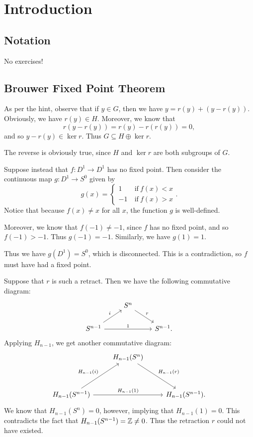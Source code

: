 \documentclass[../../solutions.tex]{subfiles}
\begin{document}
\section{Introduction} 
\subsection{Notation} 
No exercises! 

\subsection{Brouwer Fixed Point Theorem} 
\begin{exercise} \leavevmode
As per the hint, observe that if $y\in G$, then we have $y=r(y)+(y-r(y))$. Obviously, we have $r(y)\in H$. Moreover, we know that \[r(y-r(y))=r(y)-r(r(y))=0,\] and so $y-r(y)\in\ker r$. Thus $G\subseteq H\oplus\ker r$. 

The reverse is obviously true, since $H$ and $\ker r$ are both subgroups of $G$. 
\end{exercise} 

\begin{exercise} \leavevmode
Suppose instead that $f:D^1\to D^1$ has no fixed point. Then consider the continuous map $g:D^1\to S^0$ given by \[g(x)=\begin{cases}1&~\text{if}~f(x)<x\\-1&~\text{if}~f(x)>x\end{cases}.\] Notice that because $f(x)\ne x$ for all $x$, the function $g$ is well-defined. 

Moreover, we know that $f(-1)\ne-1$, since $f$ has no fixed point, and so $f(-1)>-1$. Thus $g(-1)=-1$. Similarly, we have $g(1)=1$. 

Thus we have $g(D^1)=S^0$, which is disconnected. This is a contradiction, so $f$ must have had a fixed point. 
\end{exercise} 

\begin{exercise} \leavevmode
Suppose that $r$ is such a retract. Then we have the following commutative diagram: 
\[\begin{tikzcd}
&S^n\arrow[rd,"r"]&\\
S^{n-1}\arrow[ru,"i"]\arrow[rr,"1"]&&S^{n-1}. 
\end{tikzcd}\] 
Applying $H_{n-1}$, we get another commutative diagram: 
\[\begin{tikzcd}[row sep=huge] 
&H_{n-1}(S^n)\arrow[rd,"H_{n-1}(r)"]&\\
H_{n-1}(S^{n-1})\arrow[ru,"H_{n-1}(i)"]\arrow[rr,"H_{n-1}(1)"]&&H_{n-1}(S^{n-1}).
\end{tikzcd}\]
We know that $H_{n-1}(S^n)=0$, however, implying that $H_{n-1}(1)=0$. This contradicts the fact that $H_{n-1}(S^{n-1})=\mathbb{Z}\ne0$. Thus the retraction $r$ could not have existed. 
\end{exercise} 
\end{document}
